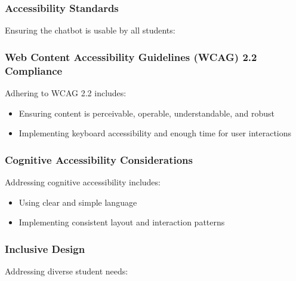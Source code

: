 \documentclass[14pt,a4paper]{article}
\begin{document}
\begin{multicols}{2}
\subsubsection{Accessibility Standards}
Ensuring the chatbot is usable by all students:

\subsubsection{Web Content Accessibility Guidelines (WCAG) 2.2 Compliance}
Adhering to WCAG 2.2 \textit{\parencite{W3C2023}} includes:
\begin{itemize}
    \item Ensuring content is perceivable, operable, understandable, and robust
    \item Implementing keyboard accessibility and enough time for user interactions
\end{itemize}


\subsubsection{Cognitive Accessibility Considerations}
Addressing cognitive accessibility \textit{\parencite[pp. 1-10]{Yesilada2023}} includes:
\begin{itemize}
    \item Using clear and simple language
    \item Implementing consistent layout and interaction patterns
\end{itemize}

\subsubsection{Inclusive Design}
Addressing diverse student needs:




\end{multicols}
\end{document}
